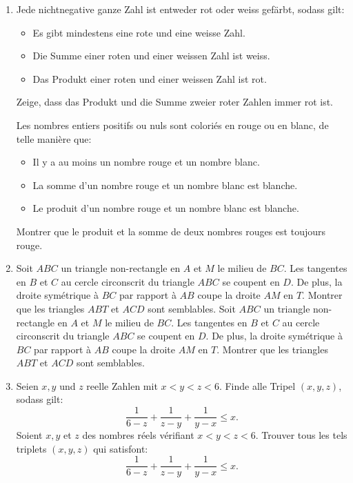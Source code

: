 \documentclass[language=german,style=exam]{smo}
\title{\translation{SMO - Weisse Prüfung}{OSM - Test blanc}{???}}
\begin{document}
\begin{enumerate}[label=\textbf{\arabic*.}]

\item\translation%
{Jede nichtnegative ganze Zahl ist entweder rot oder weiss gefärbt, sodass gilt:
\begin{itemize}
\item Es gibt mindestens eine rote und eine weisse Zahl.
\item Die Summe einer roten und einer weissen Zahl ist weiss.
\item Das Produkt einer roten und einer weissen Zahl ist rot.
\end{itemize}
Zeige, dass das Produkt und die Summe zweier roter Zahlen immer rot ist.}
{Les nombres entiers positifs ou nuls sont coloriés en rouge ou en blanc, de telle manière que:
\begin{itemize}
\item Il y a au moins un nombre rouge et un nombre blanc.
\item La somme d'un nombre rouge et un nombre blanc est blanche.
\item Le produit d'un nombre rouge et un nombre blanc est blanche.
\end{itemize}
Montrer que le produit et la somme de deux nombres rouges est toujours rouge.}
{}

\bigskip\bigskip

\item\translation%
{Soit $ABC$ un triangle non-rectangle en $A$ et $M$ le milieu de $BC$. Les tangentes en $B$ et $C$ au cercle circonscrit du triangle $ABC$ se coupent en $D$. De plus, la droite symétrique à $BC$ par rapport à $AB$ coupe la droite $AM$ en $T$. Montrer que les triangles $ABT$ et $ACD$ sont semblables.}%
{Soit $ABC$ un triangle non-rectangle en $A$ et $M$ le milieu de $BC$. Les tangentes en $B$ et $C$ au cercle circonscrit du triangle $ABC$ se coupent en $D$. De plus, la droite symétrique à $BC$ par rapport à $AB$ coupe la droite $AM$ en $T$. Montrer que les triangles $ABT$ et $ACD$ sont semblables.}
{}

\bigskip\bigskip

\item\translation%
{Seien $x,y$ und $z$ reelle Zahlen mit $x<y<z<6$. Finde alle Tripel $(x,y,z)$, sodass gilt:
\[
\frac{1}{6-z} + \frac{1}{z-y} + \frac{1}{y-x} \leq x.
\]}
{Soient $x,y$ et $z$ des nombres réels vérifiant $x<y<z<6$. Trouver tous les tels triplets $(x,y,z)$ qui satisfont:
\[
\frac{1}{6-z} + \frac{1}{z-y} + \frac{1}{y-x} \leq x.
\]}
{}


\end{enumerate}
\end{document}
